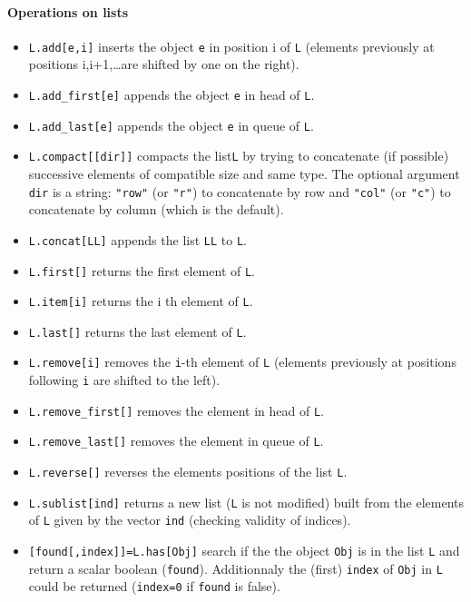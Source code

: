 \paragraph{Operations on lists}
\begin{itemize}
   \item \verb+L.add[e,i]+ inserts the object \verb+e+ in position i of \verb+L+
     (elements previously at positions i,i+1,\ldots are shifted by one on the right). 
   \item \verb+L.add_first[e]+ appends the object \verb+e+ in head of \verb+L+.
   \item \verb+L.add_last[e]+ appends the object \verb+e+ in queue of \verb+L+.
   \item \verb+L.compact[[dir]]+ compacts the list\verb+L+ by trying to concatenate (if possible) 
     successive elements of compatible size and same type. The optional argument \verb+dir+  
     is a string: \verb+"row"+ (or \verb+"r"+) to concatenate by row and \verb+"col"+ 
     (or \verb+"c"+) to concatenate by column (which is the default). 
   \item \verb+L.concat[LL]+ appends the list \verb+LL+ to \verb+L+.
   \item \verb+L.first[]+ returns the first element of \verb+L+.
   \item \verb+L.item[i]+ returns the i th element of \verb+L+.
   \item \verb+L.last[]+ returns the last element of \verb+L+.
   \item \verb+L.remove[i]+ removes the \verb+i+-th element of \verb+L+
     (elements previously at positions following \verb+i+  are shifted to the left).
   \item \verb+L.remove_first[]+ removes the element in head of \verb+L+.
   \item \verb+L.remove_last[]+ removes the element in queue of \verb+L+.
   \item \verb+L.reverse[]+ reverses the elements positions of the list  \verb+L+.
   \item \verb+L.sublist[ind]+ returns a new list (\verb+L+ is not modified) 
     built from the elements of \verb+L+ given by the vector \verb+ind+ (checking validity of indices).
   \item \verb+[found[,index]]=L.has[Obj]+ search if the the object \verb+Obj+ is 
     in the list \verb+L+ and return a scalar boolean (\verb+found+). Additionnaly the 
     (first) \verb+index+ of \verb+Obj+ in  \verb+L+ could be returned  
     (\verb+index=0+ if \verb+found+ is false).
\end{itemize}

